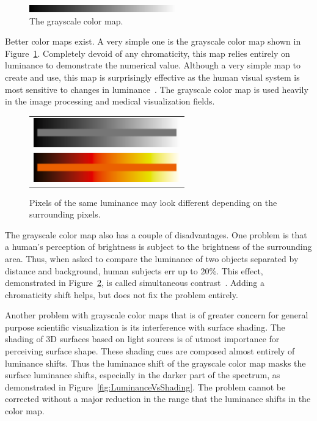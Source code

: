 \documentclass{vgtc}                          %
\newcommand{\lcite}[1]{~\cite{#1}}
\begin{document}
\begin{figure}
  \centering
  \includegraphics[width=2.5in]{images/GrayscaleBar}
  \caption{The grayscale color map.}
  \label{fig:GrayscaleColorMap}
\end{figure}
Better color maps exist.  A very simple one is the grayscale
color map shown in Figure~\ref{fig:GrayscaleColorMap}.  Completely devoid
of any chromaticity, this map relies entirely on luminance to demonstrate
the numerical value.  Although a very simple map to create and use, this
map is surprisingly effective as the human visual system is most sensitive
to changes in luminance\lcite{Ware04,Mullen85}.  The grayscale color map is
used heavily in the image processing and medical visualization fields.

\begin{figure}
  \centering
  \begin{tabular}{c}
    \includegraphics[width=2.5in]{images/GrayscaleLocality} \\
    \includegraphics[width=2.5in]{images/BlackBodyLocality}
  \end{tabular}
  \caption{Pixels of the same luminance may look different depending on the
    surrounding pixels.}
  \label{fig:SimultaneousContrast}
\end{figure}
The grayscale color map also has a couple of disadvantages.  One problem is
that a human's perception of brightness is subject to the brightness of the
surrounding area.  Thus, when asked to compare the luminance of two objects
separated by distance and background, human subjects err up to 20\%.
This effect, demonstrated in Figure~\ref{fig:SimultaneousContrast}, is
called simultaneous contrast\lcite{Stone05}.  Adding a chromaticity shift
helps, but does not fix the problem entirely.

Another problem with grayscale color maps that is of greater concern for
general purpose scientific visualization is its interference with surface
shading.  The shading of 3D surfaces based on light sources is of utmost
importance for perceiving surface shape.  These shading cues are
composed almost entirely of luminance shifts.  Thus the luminance shift of
the grayscale color map masks the surface luminance shifts, especially in
the darker part of the spectrum, as demonstrated in
Figure~\ref{fig:LuminanceVsShading}.  The problem cannot be corrected
without a major reduction in the range that the luminance shifts in the color
map.
\end{document}
